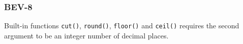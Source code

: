\subsubsection{BEV-8}\label{sec:error_code_bev_8}

Built-in functions \texttt{cut()}, \texttt{round()}, \texttt{floor()} and \texttt{ceil()} requires the second argument to be an integer number of decimal places.


